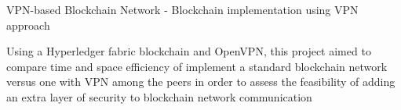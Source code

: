 {VPN-based Blockchain Network - Blockchain implementation using VPN approach}
{
\jbegin
    \item{
            Using a Hyperledger fabric blockchain and OpenVPN, this project aimed to compare time and space efficiency
            of implement a standard blockchain network versus one with VPN among the peers in order to assess the feasibility of adding
            an extra layer of security to blockchain network communication
        }
\jend
}
